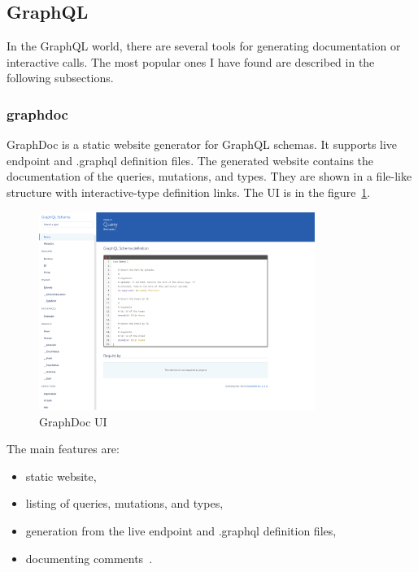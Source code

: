 
\subsection{GraphQL}
In the GraphQL world, there are several tools for generating documentation or interactive calls.
The most popular ones I have found are described in the following subsections.

\subsubsection{graphdoc}
GraphDoc is a static website generator for GraphQL schemas.
It supports live endpoint and .graphql definition files.
The generated website contains the documentation of the queries, mutations, and types.
They are shown in a file-like structure with interactive-type definition links.
The UI is in the figure~\ref{fig:graphql-graphdoc}.
\cite{graphql-graphdoc}

\begin{figure}[hbt!]
    \centering
    \captionsetup{justification=centering}
    \includegraphics[width=0.8\textwidth]{images/graphql/graphdoc}
    \caption{GraphDoc UI~\cite{graphql-graphdoc}}
    \label{fig:graphql-graphdoc}
\end{figure}

The main features are:
\begin{itemize}
    \item static website,
    \item listing of queries, mutations, and types,
    \item generation from the live endpoint and .graphql definition files,
    \item documenting comments~\cite{graphql-graphdoc}.
\end{itemize}

